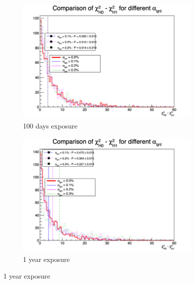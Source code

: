 \documentclass[../main.tex]{subfiles}
\begin{document}
\begin{figure}[th]
  \centering
  \begin{subfigure}[t]{0.48\linewidth}
    \includegraphics[width=\linewidth]{images/joint_fit/stat_tests/chi2_H_100d.png}
    \caption{100 days exposure}
  \end{subfigure}
  \begin{subfigure}[t]{0.48\linewidth}
    \includegraphics[width=\linewidth]{images/joint_fit/stat_tests/chi2_H_1y.png}
    \caption{1 year exposure}
  \end{subfigure}



\end{figure}
\end{document}

